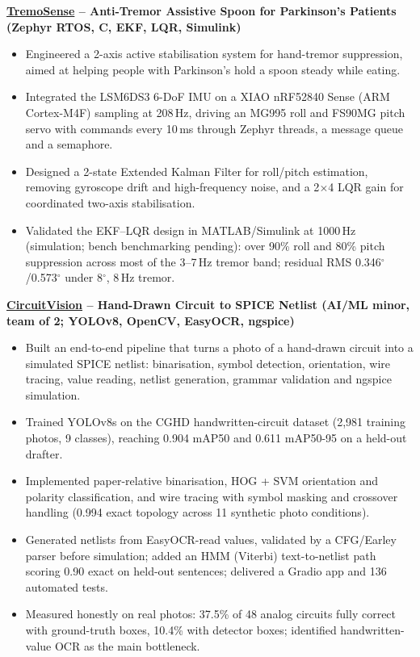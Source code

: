 \documentclass[10pt,letterpaper]{article}
\newcommand{\lnk}[2]{\href{#1}{\textcolor{linkblue}{#2}}}
\newcommand{\proj}[1]{\par\vspace{5pt}\textbf{#1}\par}
\begin{document}
\proj{\lnk{https://github.com/rkt-1597/TremoSense-Project}{TremoSense} -- Anti-Tremor Assistive Spoon for Parkinson's Patients \normalfont(Zephyr RTOS, C, EKF, LQR, Simulink)}
\begin{itemize}
\item Engineered a 2-axis active stabilisation system for hand-tremor suppression, aimed at helping people with Parkinson's hold a spoon steady while eating.
\item Integrated the LSM6DS3 6-DoF IMU on a XIAO nRF52840 Sense (ARM Cortex-M4F) sampling at 208\,Hz, driving an MG995 roll and FS90MG pitch servo with commands every 10\,ms through Zephyr threads, a message queue and a semaphore.
\item Designed a 2-state Extended Kalman Filter for roll/pitch estimation, removing gyroscope drift and high-frequency noise, and a 2$\times$4 LQR gain for coordinated two-axis stabilisation.
\item Validated the EKF--LQR design in MATLAB/Simulink at 1000\,Hz (simulation; bench benchmarking pending): over 90\% roll and 80\% pitch suppression across most of the 3--7\,Hz tremor band; residual RMS 0.346$^\circ$/0.573$^\circ$ under 8$^\circ$, 8\,Hz tremor.
\end{itemize}

\proj{\lnk{https://github.com/sudo-pranshu/CircuitVision}{CircuitVision} -- Hand-Drawn Circuit to SPICE Netlist \normalfont(AI/ML minor, team of 2; YOLOv8, OpenCV, EasyOCR, ngspice)}
\begin{itemize}
\item Built an end-to-end pipeline that turns a photo of a hand-drawn circuit into a simulated SPICE netlist: binarisation, symbol detection, orientation, wire tracing, value reading, netlist generation, grammar validation and ngspice simulation.
\item Trained YOLOv8s on the CGHD handwritten-circuit dataset (2,981 training photos, 9 classes), reaching 0.904 mAP50 and 0.611 mAP50-95 on a held-out drafter.
\item Implemented paper-relative binarisation, HOG + SVM orientation and polarity classification, and wire tracing with symbol masking and crossover handling (0.994 exact topology across 11 synthetic photo conditions).
\item Generated netlists from EasyOCR-read values, validated by a CFG/Earley parser before simulation; added an HMM (Viterbi) text-to-netlist path scoring 0.90 exact on held-out sentences; delivered a Gradio app and 136 automated tests.
\item Measured honestly on real photos: 37.5\% of 48 analog circuits fully correct with ground-truth boxes, 10.4\% with detector boxes; identified handwritten-value OCR as the main bottleneck.
\end{itemize}
\end{document}
